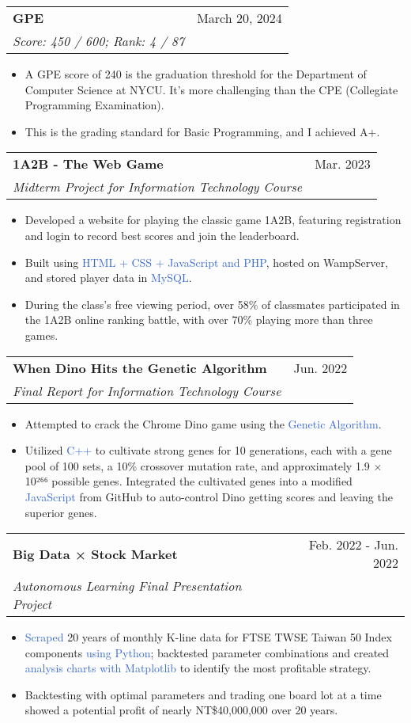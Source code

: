\documentclass[a4paper,10pt]{extarticle}
\makeatletter
\newcommand{\resumeSubheading}[4]{
  \vspace{-1pt}\item
    \begin{tabular*}{0.97\textwidth}{l@{\extracolsep{\fill}}r}
      \textbf{#1} & #2 \\
      \textit{#3} & \textit{#4} \\
    \end{tabular*}\vspace{-5pt}
}
\makeatother
\begin{document}
\newpage %
    \resumeSubheading
      {GPE}{March 20, 2024}
      {Score: 450 / 600; Rank: 4 / 87}{}
	\begin{itemize}
	    \item A GPE score of 240 is the graduation threshold for the Department of Computer Science at NYCU. It’s more challenging than the CPE (Collegiate Programming Examination).
	    \item This is the grading standard for Basic Programming, and I achieved A+.
	\end{itemize}

    \resumeSubheading
      {1A2B - The Web Game}{Mar. 2023}
      {Midterm Project for Information Technology Course}{}
	\begin{itemize}
	    \item Developed a website for playing the classic game 1A2B, featuring registration and login to record best scores and join the leaderboard.
	    \item Built using \textcolor{highlight}{HTML + CSS + JavaScript and PHP}, hosted on WampServer, and stored player data in \textcolor{highlight}{MySQL}.
	    \item During the class's free viewing period, over 58\% of classmates participated in the 1A2B online ranking battle, with over 70\% playing more than three games.
	\end{itemize}

    \resumeSubheading
      {When Dino Hits the Genetic Algorithm}{Jun. 2022}
      {Final Report for Information Technology Course}{}
	\begin{itemize}
	    \item Attempted to crack the Chrome Dino game using the \textcolor{highlight}{Genetic Algorithm}.
	    \item Utilized \textcolor{highlight}{C++} to cultivate strong genes for 10 generations, each with a gene pool of 100 sets, a 10\% crossover mutation rate, and approximately 1.9 × 10²⁶⁶ possible genes. Integrated the cultivated genes into a modified \textcolor{highlight}{JavaScript} from GitHub to auto-control Dino getting scores and leaving the superior genes.
	\end{itemize}

    \resumeSubheading
      {Big Data × Stock Market}{Feb. 2022 - Jun. 2022}
      {Autonomous Learning Final Presentation Project}{}
	\begin{itemize}
	    \item \textcolor{highlight}{Scraped} 20 years of monthly K-line data for FTSE TWSE Taiwan 50 Index components \textcolor{highlight}{using Python}; backtested parameter combinations and created \textcolor{highlight}{analysis charts with Matplotlib} to identify the most profitable strategy.
	    \item Backtesting with optimal parameters and trading one board lot at a time showed a potential profit of nearly NT\$40,000,000 over 20 years.
	\end{itemize}
\end{document}

